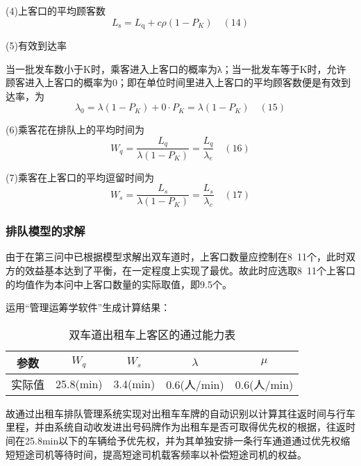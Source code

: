 \documentclass[withoutpreface,bwprint]{cumcmthesis} %
\begin{document}
(4)上客口的平均顾客数
$$
L_{\mathrm{s}}=L_{\mathrm{q}}+c \rho\left(1-P_{K}\right) \quad(14)
$$

(5)有效到达率


当一批发车数小于K时，乘客进入上客口的概率为λ；当一批发车等于K时，允许顾客进入上客口的概率为0；即在单位时间里进入上客口的平均顾客数便是有效到达率，为
$$
\lambda_{0}=\lambda\left(1-P_{K}\right)+0 \cdot P_{K}=\lambda\left(1-P_{K}\right) \quad(15)
$$

(6)乘客花在排队上的平均时间为
$$
W_{q}=\frac{L_{q}}{\lambda\left(1-P_{K}\right)}=\frac{L_{q}}{\lambda_{e}}  \quad(16)
$$

(7)乘客在上客口的平均逗留时间为
$$
W_{s}=\frac{L_{s}}{\lambda\left(1-P_{K}\right)}=\frac{L_{s}}{\lambda_{c}}  \quad(17)
$$

\subsubsection{排队模型的求解}
由于在第三问中已根据模型求解出双车道时，上客口数量应控制在8~11个，此时双方的效益基本达到了平衡，在一定程度上实现了最优。故此时应选取8~11个上客口的均值作为本问中上客口数量的实际取值，即9.5个。

运用“管理运筹学软件”生成计算结果：
\begin{table}[!htbp]
	\caption{双车道出租车上客区的通过能力表}\label{tab:009} \centering
	\begin{tabular}{ccccc}
		\toprule[2pt]
		参数 & $W_q$ & $W_s$ & $\lambda$ & $\mu$\\
		\midrule[1pt]
		实际值 & 25.8(min) & 3.4(min) & 0.6(人/min) & 0.6(人/min)\\
		\bottomrule[1.5pt]
	\end{tabular}
\end{table}
故通过出租车排队管理系统实现对出租车车牌的自动识别以计算其往返时间与行车里程，并由系统自动收发进出号码牌作为出租车是否可取得优先权的根据，往返时间在25.8min以下的车辆给予优先权，并为其单独安排一条行车通道通过优先权缩短短途司机等待时间，提高短途司机载客频率以补偿短途司机的权益。
\newpage


\end{document}
